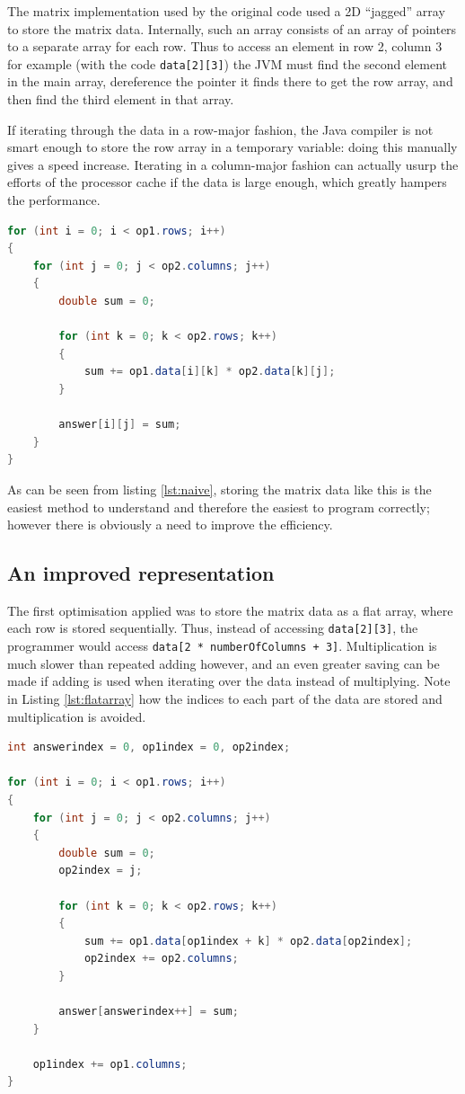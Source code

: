The matrix implementation used by the original code used a 2D ``jagged'' array to store the matrix data.  Internally, such an array consists of an array of pointers to a separate array for each row.  Thus to access an element in row 2, column 3 for example (with the code {\tt data[2][3]}) the JVM must find the second element in the main array, dereference the pointer it finds there to get the row array, and then find the third element in that array.

If iterating through the data in a row-major fashion, the Java compiler is not smart enough to store the row array in a temporary variable: doing this manually gives a speed increase.  Iterating in a column-major fashion can actually usurp the efforts of the processor cache if the data is large enough, which greatly hampers the performance.

\begin{lstlisting}[language=java,caption={Multiply code},captionpos=b,label=lst:naive,float]
for (int i = 0; i < op1.rows; i++)
{
    for (int j = 0; j < op2.columns; j++)
    {
        double sum = 0;

        for (int k = 0; k < op2.rows; k++)
        {
            sum += op1.data[i][k] * op2.data[k][j];
        }

        answer[i][j] = sum;
    }
}
\end{lstlisting}

As can be seen from listing \ref{lst:naive}, storing the matrix data like this is the easiest method to understand and therefore the easiest to program correctly; however there is obviously a need to improve the efficiency.

\subsection{An improved representation}

The first optimisation applied was to store the matrix data as a flat array, where each row is stored sequentially.  Thus, instead of accessing {\tt data[2][3]}, the programmer would access {\tt data[2 * numberOfColumns + 3]}.  Multiplication is much slower than repeated adding however, and an even greater saving can be made if adding is used when iterating over the data instead of multiplying.  Note in Listing \ref{lst:flatarray} how the indices to each part of the data are stored and multiplication is avoided.

\begin{lstlisting}[language=java,caption={Multiply code with flat arrays},captionpos=b,label=lst:flatarray,float]
int answerindex = 0, op1index = 0, op2index;

for (int i = 0; i < op1.rows; i++)
{
    for (int j = 0; j < op2.columns; j++)
    {
        double sum = 0;
        op2index = j;

        for (int k = 0; k < op2.rows; k++)
        {
            sum += op1.data[op1index + k] * op2.data[op2index];
            op2index += op2.columns;
        }

        answer[answerindex++] = sum;
    }

    op1index += op1.columns;
}
\end{lstlisting}

